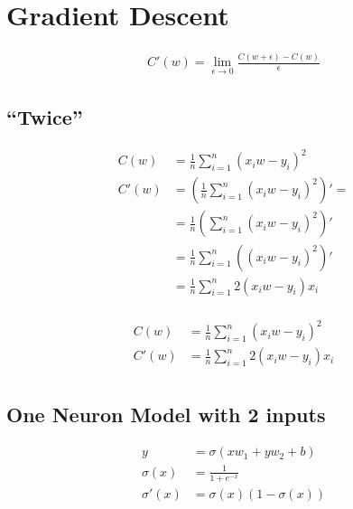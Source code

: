 \documentclass{article}
\begin{document}
\section{Gradient Descent}

\begin{align}
  C'(w) = \lim_{\epsilon \to 0}\frac{C(w + \epsilon) - C(w)}{\epsilon}
\end{align}

\subsection{``Twice''}

\begin{align}
  C(w) &= \frac{1}{n}\sum_{i=1}^{n}(x_iw - y_i)^2 \\
  C'(w)
       &= \left(\frac{1}{n}\sum_{i=1}^{n}(x_iw - y_i)^2\right)' = \\
       &= \frac{1}{n}\left(\sum_{i=1}^{n}(x_iw - y_i)^2\right)' \\
       &= \frac{1}{n}\sum_{i=1}^{n}\left((x_iw - y_i)^2\right)' \\
       &= \frac{1}{n}\sum_{i=1}^{n}2(x_iw - y_i)x_i \\
\end{align}

\begin{align}
  C(w) &= \frac{1}{n}\sum_{i=1}^{n}(x_iw - y_i)^2 \\  
  C'(w) &= \frac{1}{n}\sum_{i=1}^{n}2(x_iw - y_i)x_i \\
\end{align}

\subsection{One Neuron Model with 2 inputs}

\def\d{2.0}

\begin{center}
\end{center}
\begin{align}
  y &= \sigma(xw_1 + yw_2 + b) \\
  \sigma(x) &= \frac{1}{1 + e^{-x}} \\
  \sigma'(x) &= \sigma(x)(1 - \sigma(x)) \\
\end{align}
\end{document}
